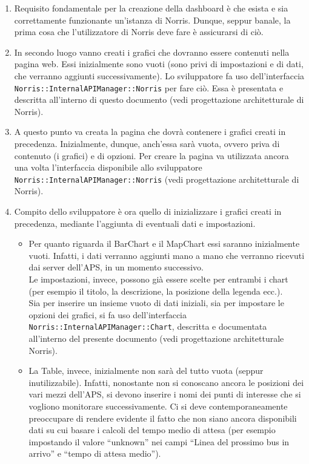         \begin{enumerate}
            \item Requisito fondamentale per la creazione della dashboard è che esista e sia correttamente funzionante un'istanza di Norris. Dunque, seppur banale, la prima cosa che l'utilizzatore di Norris deve fare è assicurarsi di ciò.
            \item In secondo luogo vanno creati i grafici che dovranno essere contenuti nella pagina web. Essi inizialmente sono vuoti (sono privi di impostazioni e di dati, che verranno aggiunti successivamente). Lo sviluppatore fa uso dell'interfaccia \texttt{Norris::InternalAPIManager::Norris} per fare ciò. Essa è presentata e descritta all'interno di questo documento (vedi progettazione architetturale di Norris).
            \item A questo punto va creata la pagina che dovrà contenere i grafici creati in precedenza. Inizialmente, dunque, anch'essa sarà vuota, ovvero priva di contenuto (i grafici) e di opzioni. Per creare la pagina va utilizzata ancora una volta l'interfaccia disponibile allo sviluppatore \texttt{Norris::InternalAPIManager::Norris} (vedi progettazione architetturale di Norris).
            \item Compito dello sviluppatore è ora quello di inizializzare i grafici creati in precedenza, mediante l'aggiunta di eventuali dati e impostazioni.
            \begin{itemize}
                \item Per quanto riguarda il BarChart e il MapChart essi saranno inizialmente vuoti. Infatti, i dati verranno aggiunti mano a mano che verranno ricevuti dai server dell'APS, in un momento successivo.\\
                Le impostazioni, invece, possono già essere scelte per entrambi i chart (per esempio il titolo, la descrizione, la posizione della legenda ecc.).\\
                Sia per inserire un insieme vuoto di dati iniziali, sia per impostare le opzioni dei grafici, si fa uso dell'interfaccia \texttt{Norris::InternalAPIManager::Chart}, descritta e documentata all'interno del presente documento (vedi progettazione architetturale Norris).
                \item La Table, invece, inizialmente non sarà del tutto vuota (seppur inutilizzabile). Infatti, nonostante non si conoscano ancora le posizioni dei vari mezzi dell'APS, si devono inserire i nomi dei punti di interesse che si vogliono monitorare successivamente. Ci si deve contemporaneamente preoccupare di rendere evidente il fatto che non siano ancora disponibili dati su cui basare i calcoli del tempo medio di attesa (per esempio impostando il valore “unknown” nei campi “Linea del prossimo bus in arrivo” e “tempo di attesa medio”).\\

\end{itemize}
\end{enumerate}
